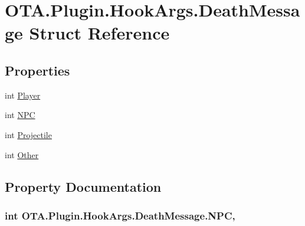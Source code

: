 \hypertarget{struct_o_t_a_1_1_plugin_1_1_hook_args_1_1_death_message}{}\section{O\+T\+A.\+Plugin.\+Hook\+Args.\+Death\+Message Struct Reference}
\label{struct_o_t_a_1_1_plugin_1_1_hook_args_1_1_death_message}
\subsection*{Properties}
\begin{DoxyCompactItemize}
\item 
int \hyperlink{struct_o_t_a_1_1_plugin_1_1_hook_args_1_1_death_message_a32f8fbd02342ca7b7d8094b8998432ff}{Player}
\item 
int \hyperlink{struct_o_t_a_1_1_plugin_1_1_hook_args_1_1_death_message_a0bb26a99d143e0725bbda3d926203072}{N\+P\+C}
\item 
int \hyperlink{struct_o_t_a_1_1_plugin_1_1_hook_args_1_1_death_message_adc36b0cf70a60089a9110998d035a2ad}{Projectile}
\item 
int \hyperlink{struct_o_t_a_1_1_plugin_1_1_hook_args_1_1_death_message_a782ad051e52e79a92cc8a1d0f1e71376}{Other}
\end{DoxyCompactItemize}


\subsection{Property Documentation}
\hypertarget{struct_o_t_a_1_1_plugin_1_1_hook_args_1_1_death_message_a0bb26a99d143e0725bbda3d926203072}{}
\subsubsection[{N\+P\+C}]{\setlength{\rightskip}{0pt plus 5cm}int O\+T\+A.\+Plugin.\+Hook\+Args.\+Death\+Message.\+N\+P\+C\hspace{0.3cm}{\ttfamily [get]}, {\ttfamily [set]}}\label{struct_o_t_a_1_1_plugin_1_1_hook_args_1_1_death_message_a0bb26a99d143e0725bbda3d926203072}
\hypertarget{struct_o_t_a_1_1_plugin_1_1_hook_args_1_1_death_message_a782ad051e52e79a92cc8a1d0f1e71376}{}
